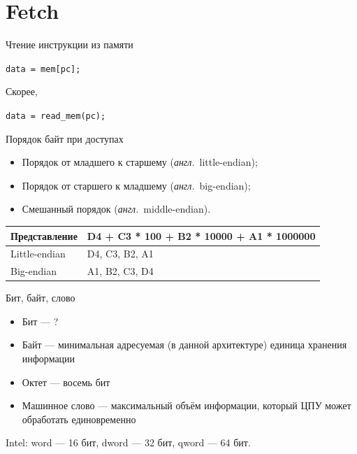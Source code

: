 \documentclass{beamer}
\newcommand{\abbr}{\textit{англ.}\ }
\begin{document}
\section{Fetch}

\begin{frame}{Чтение инструкции из памяти}

\texttt{data = mem[pc];}

\pause
Скорее,

\texttt{data = read_mem(pc);}

\end{frame}

\begin{frame}{Порядок байт при доступах}

\begin{itemize}
    \item Порядок от младшего к старшему (\abbr little-endian);
    \item Порядок от старшего к младшему (\abbr big-endian);
    \item Смешанный порядок (\abbr middle-endian).
\end{itemize}

\centering
\begin{tabular}{|l|l|}
\hline
Представление   &   D4 + C3 * 100 + B2 * 10000 + A1 * 1000000   \\
\hline
Little-endian   &   D4, C3, B2, A1                              \\
\hline
Big-endian      &   A1, B2, C3, D4                              \\
\hline
\end{tabular}

\end{frame}

\begin{frame}{Бит, байт, слово}

\begin{itemize}
\item Бит \pause — ?
\item Байт \pause — минимальная адресуемая (в данной архитектуре) единица хранения
информации \pause
\item Октет \pause — восемь бит \pause
\item Машинное слово \pause — максимальный объём информации, который ЦПУ может обработать единовременно
\end{itemize}

\pause
Intel: word — 16 бит, dword — 32 бит, qword — 64 бит.

\end{frame}
\end{document}
